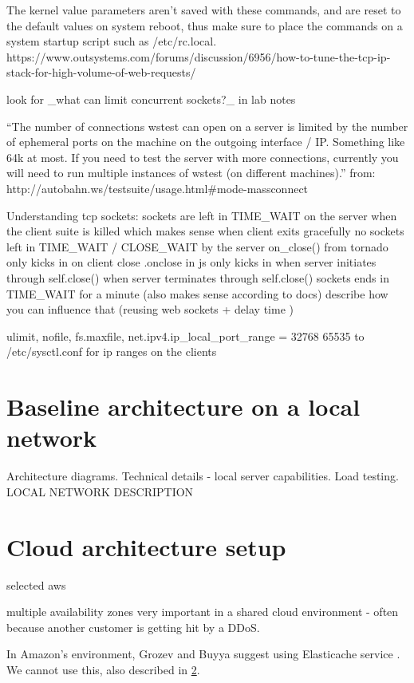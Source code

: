 \documentclass{uvamscse}
\begin{document}
The kernel value parameters aren't saved with these commands, and are reset to the default values on system reboot, thus make sure to place the commands on a system startup script such as /etc/rc.local.
https://www.outsystems.com/forums/discussion/6956/how-to-tune-the-tcp-ip-stack-for-high-volume-of-web-requests/

look for \_what can limit concurrent sockets?\_ in lab notes

“The number of connections wstest can open on a server is limited by the number of ephemeral ports on the machine on the outgoing interface / IP. Something like 64k at most. If you need to test the server with more connections, currently you will need to run multiple instances of wstest (on different machines).” from: http://autobahn.ws/testsuite/usage.html\#mode-massconnect

Understanding tcp sockets:
sockets are left in TIME\_WAIT on the server when the client suite is killed which makes sense
when client exits gracefully no sockets left in TIME\_WAIT / CLOSE\_WAIT by the server
on\_close() from tornado only kicks in on client close
.onclose in js only kicks in when server initiates through self.close()
when server terminates through self.close() sockets ends in TIME\_WAIT for a minute (also makes sense according to docs)
describe how you can influence that (reusing web sockets + delay time )

ulimit, nofile, fs.max\-file, net.ipv4.ip\_local\_port\_range = 32768 65535  to /etc/sysctl.conf for ip ranges on the clients

\section{Baseline architecture on a local network}
Architecture diagrams.
Technical details - local server capabilities.
Load testing.
LOCAL NETWORK DESCRIPTION

\section{Cloud architecture setup} \label{Cloud architecture setup}

selected aws

multiple availability zones very important in a shared cloud environment - often because another customer is getting hit by a DDoS.\cite{GroBuy}

In Amazon’s environment, Grozev and Buyya suggest using Elasticache service \cite{GroBuy}. We cannot use this, also described in \ref{Cloud architecture setup}.
\end{document}
